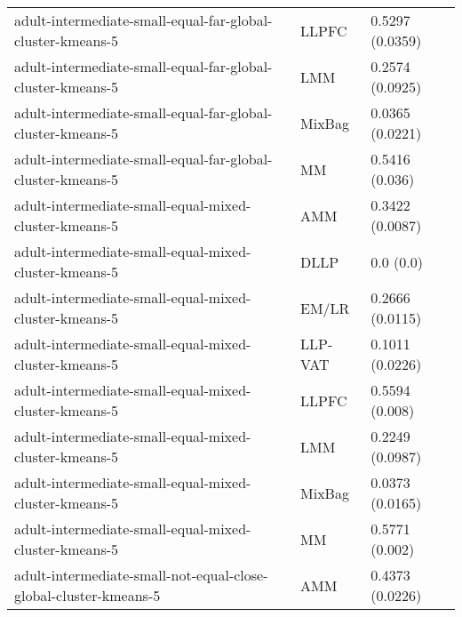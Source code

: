 \begin{longtable}{lll}
                                                   adult-intermediate-small-equal-far-global-cluster-kmeans-5 &     LLPFC &                           0.5297 (0.0359) \\
                                                   adult-intermediate-small-equal-far-global-cluster-kmeans-5 &       LMM &                           0.2574 (0.0925) \\
                                                   adult-intermediate-small-equal-far-global-cluster-kmeans-5 &    MixBag &                           0.0365 (0.0221) \\
                                                   adult-intermediate-small-equal-far-global-cluster-kmeans-5 &        MM &                            0.5416 (0.036) \\
                                                        adult-intermediate-small-equal-mixed-cluster-kmeans-5 &       AMM &                           0.3422 (0.0087) \\
                                                        adult-intermediate-small-equal-mixed-cluster-kmeans-5 &      DLLP &                                 0.0 (0.0) \\
                                                        adult-intermediate-small-equal-mixed-cluster-kmeans-5 &     EM/LR &                           0.2666 (0.0115) \\
                                                        adult-intermediate-small-equal-mixed-cluster-kmeans-5 &   LLP-VAT &                           0.1011 (0.0226) \\
                                                        adult-intermediate-small-equal-mixed-cluster-kmeans-5 &     LLPFC &                            0.5594 (0.008) \\
                                                        adult-intermediate-small-equal-mixed-cluster-kmeans-5 &       LMM &                           0.2249 (0.0987) \\
                                                        adult-intermediate-small-equal-mixed-cluster-kmeans-5 &    MixBag &                           0.0373 (0.0165) \\
                                                        adult-intermediate-small-equal-mixed-cluster-kmeans-5 &        MM &                            0.5771 (0.002) \\
                                             adult-intermediate-small-not-equal-close-global-cluster-kmeans-5 &       AMM &                           0.4373 (0.0226) \\

\end{longtable}
